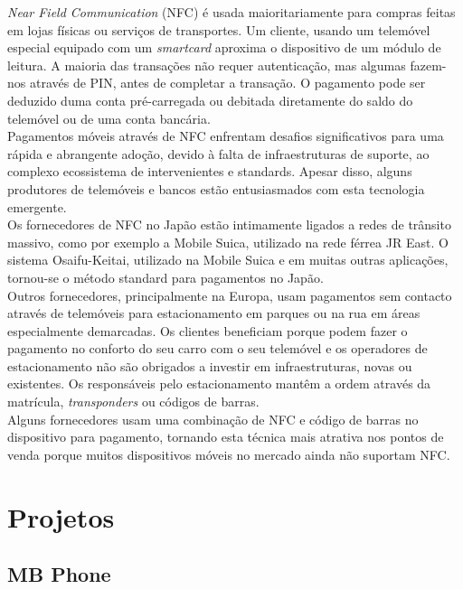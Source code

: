 \textit{Near Field Communication} (NFC) é usada maioritariamente para compras feitas em lojas físicas ou serviços de transportes. Um cliente, usando um telemóvel especial equipado com um \textit{smartcard} aproxima o dispositivo de um módulo de leitura. A maioria das transações não requer autenticação, mas algumas fazem-nos através de PIN, antes de completar a transação. O pagamento pode ser deduzido duma conta pré-carregada ou debitada diretamente do saldo do telemóvel ou de uma conta bancária.\cite{SmartCardAlliance2011}
\\Pagamentos móveis através de NFC enfrentam desafios significativos para uma rápida e abrangente adoção, devido à falta de infraestruturas de suporte, ao complexo ecossistema de intervenientes e standards. Apesar disso, alguns produtores de telemóveis e bancos estão entusiasmados com esta tecnologia emergente.\cite{vdc}
\\Os fornecedores de NFC no Japão estão intimamente ligados a redes de trânsito massivo, como por exemplo a Mobile Suica, utilizado na rede férrea JR East. O sistema Osaifu-Keitai, utilizado na Mobile Suica e em muitas outras aplicações, tornou-se o método standard para pagamentos no Japão.
\\Outros fornecedores, principalmente na Europa, usam pagamentos sem contacto através de telemóveis para estacionamento em parques ou na rua em áreas especialmente demarcadas. Os clientes beneficiam porque podem fazer o pagamento no conforto do seu carro com o seu telemóvel e os operadores de estacionamento não são obrigados a investir em infraestruturas, novas ou existentes. Os responsáveis pelo estacionamento mantêm a ordem através da matrícula, \textit{transponders} ou códigos de barras.
\\Alguns fornecedores usam uma combinação de NFC e código de barras no dispositivo para pagamento, tornando esta técnica mais atrativa nos pontos de venda porque muitos dispositivos móveis no mercado ainda não suportam NFC.\cite{cimbal}

\section{Projetos} \label{projetos}

\subsection{MB Phone}

